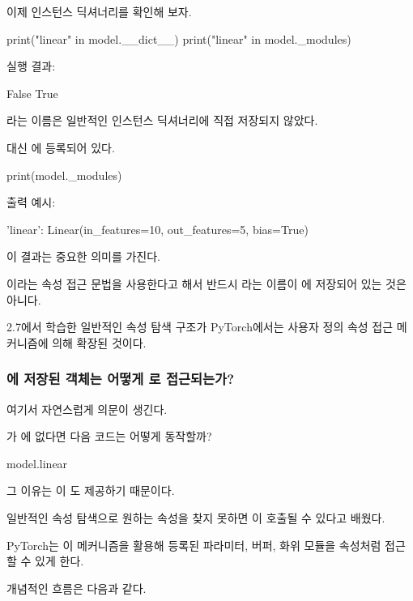 이제 인스턴스 딕셔너리를 확인해 보자.

\begin{dhkcode}
print("linear" in model.__dict__)
print("linear" in model._modules)
\end{dhkcode}

실행 결과:

\begin{dhkzsh}
False
True
\end{dhkzsh}

라는 이름은 일반적인 인스턴스 딕셔너리에 직접 저장되지 않았다.

대신 에 등록되어 있다.

\begin{dhkcode}
print(model._modules)
\end{dhkcode}

출력 예시:

\begin{dhkzsh}
{'linear': Linear(in_features=10, out_features=5, bias=True)}
\end{dhkzsh}

이 결과는 중요한 의미를 가진다.

이라는 속성 접근 문법을 사용한다고 해서 반드시 라는 이름이 에 저장되어 있는 것은 아니다.

2.7에서 학습한 일반적인 속성 탐색 구조가 PyTorch에서는 사용자 정의 속성 접근 메커니즘에 의해 확장된 것이다.

\subsubsection{에 저장된 객체는 어떻게 로 접근되는가?}

여기서 자연스럽게 의문이 생긴다.

가 에 없다면 다음 코드는 어떻게 동작할까?

\begin{dhkcode}
model.linear
\end{dhkcode}

그 이유는 이 도 제공하기 때문이다.

일반적인 속성 탐색으로 원하는 속성을 찾지 못하면 이 호출될 수 있다고 배웠다.

PyTorch는 이 메커니즘을 활용해 등록된 파라미터, 버퍼, 화위 모듈을 속성처럼 접근할 수 있게 한다.

개념적인 흐름은 다음과 같다.

